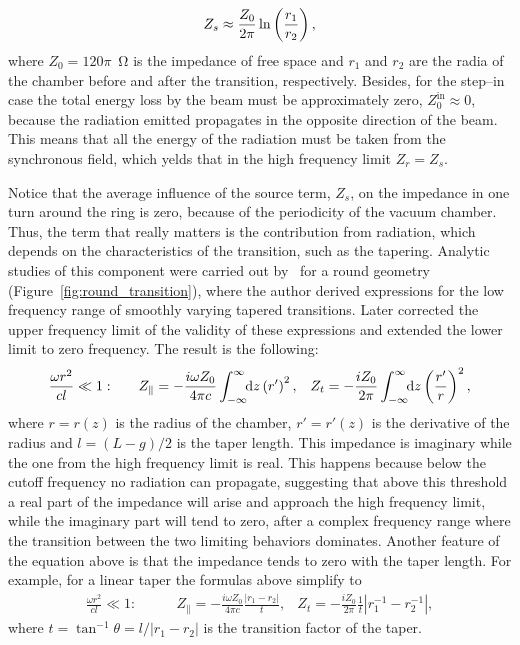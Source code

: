     \begin{align}\label{eq:transition_high_frequency}
        Z_s \approx \frac{Z_0}{2\pi}\ln\left(\frac{r_1}{r_2}\right),
    \end{align}
    where $Z_0 = 120\pi$~\si{\ohm} is the impedance of free space and $r_1$ and $r_2$ are the radia of the chamber before and after the transition, respectively. Besides, for the step--in case the total energy loss by the beam must be approximately zero, $Z_0^\text{in}\approx 0$, because the radiation emitted propagates in the opposite direction of the beam. This means that all the energy of the radiation must be taken from the synchronous field, which yelds that in the high frequency limit $Z_r = Z_s$.

    Notice that the average influence of the source term, $Z_s$, on the impedance in one turn around the ring is zero, because of the periodicity of the vacuum chamber. Thus, the term that really matters is the contribution from radiation, which depends on the characteristics of the transition, such as the tapering. Analytic studies of this component were carried out by~ for a round geometry (Figure~\ref{fig:round_transition}), where the author derived expressions for the low frequency range of smoothly varying tapered transitions. Later  corrected the upper frequency limit of the validity of these expressions and extended the lower limit to zero frequency. The result is the following:
    \begin{align}
        \frac{\omega r^2}{cl}\ll1:\quad\quad
        &Z_\parallel = -\frac{i\omega Z_0}{4\pi c}\int_{-\infty}^{\infty}\!\!\text{d}z \left(r'\right)^2, &
        Z_t = -\frac{i Z_0}{2\pi}\int_{-\infty}^{\infty}\!\!\text{d}z \left(\frac{r'}{r}\right)^2,
    \end{align}
    where $r=r(z)$ is the radius of the chamber, $r'=r'(z)$ is the derivative of the radius and $l=(L-g)/2$ is the taper length. This impedance is imaginary while the one from the high frequency limit is real. This happens because below the cutoff frequency no radiation can propagate, suggesting that above this threshold a real part of the impedance will arise and approach the high frequency limit, while the imaginary part will tend to zero, after a complex frequency range where the transition between the two limiting behaviors dominates. Another feature of the equation above is that the impedance tends to zero with the taper length. For example, for a linear taper the formulas above simplify to
    \begin{align}
        \frac{\omega r^2}{cl}\ll1:\quad\quad
        &Z_\parallel = -\frac{i\omega Z_0}{4\pi c}\frac{|r_1-r_2|}{t}, &
        Z_t = -\frac{i Z_0}{2\pi}\frac1t|r_1^{-1}-r_2^{-1}|,
    \end{align}
    where $t=\tan^{-1}\theta=l/|r_1-r_2|$ is the transition factor of the taper.

